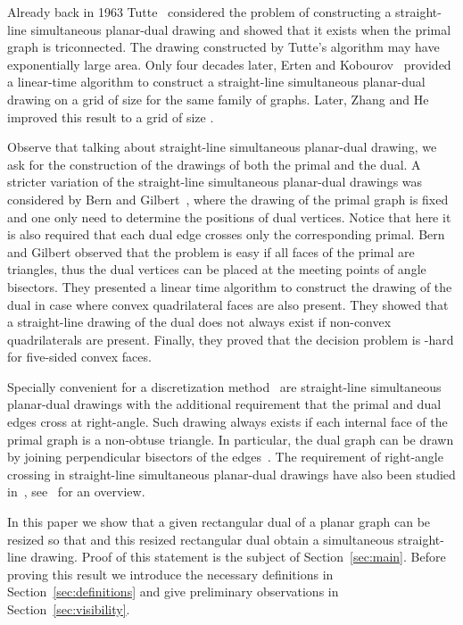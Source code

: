 \documentclass{llncs}
\begin{document}
Already back in 1963 Tutte~\cite{Tut63} considered the problem of constructing a straight-line simultaneous  planar-dual drawing and showed that it exists when the primal graph is triconnected. The drawing constructed by Tutte's algorithm may have exponentially large area. Only four decades later,  Erten and Kobourov~\cite{ErtenK05} provided a linear-time algorithm to construct a straight-line simultaneous planar-dual drawing on a grid of size  for the same family of graphs. Later, Zhang and He~\cite{ZH06} improved this result to a grid of size .

Observe that talking about straight-line simultaneous planar-dual drawing, we ask for the construction of the drawings of both the primal and the dual. A stricter variation of the straight-line simultaneous  planar-dual drawings was considered by Bern and Gilbert~\cite{BernG92}, where the drawing of the primal graph is fixed and one only need to determine the positions of dual vertices. Notice that here it is also required that each dual edge crosses only the corresponding primal. Bern and Gilbert observed that the problem is easy if all faces of the primal are triangles, thus the dual vertices can be placed at the meeting points of angle bisectors.
They presented a linear time algorithm to construct the drawing of the dual in case where convex quadrilateral faces are also present. They showed that a straight-line drawing of the dual does not always exist if non-convex quadrilaterals are present. Finally, they proved that the decision problem is -hard for five-sided convex faces. 

Specially convenient for a discretization method~\cite{Baker88}  are straight-line simultaneous planar-dual drawings with the additional requirement that the primal and dual edges cross at right-angle.  Such drawing always exists if each internal face of the primal graph  is a non-obtuse triangle. In particular, the dual graph can be drawn by joining perpendicular bisectors of the edges~\cite{Bern92}. The requirement of right-angle crossing in  straight-line simultaneous planar-dual drawings have also been studied in~\cite{ArgyriouBKS13,Brightwell93,Mohar97}, see~\cite{gdhandbook13} for an overview.

In this paper we show that a given rectangular dual  of a planar graph  can be resized so that  and this resized rectangular dual obtain a simultaneous straight-line drawing. Proof of this statement is the subject of Section~\ref{sec:main}. Before proving this result we introduce the necessary definitions in Section~\ref{sec:definitions} and give preliminary observations in Section~\ref{sec:visibility}.
\end{document}

